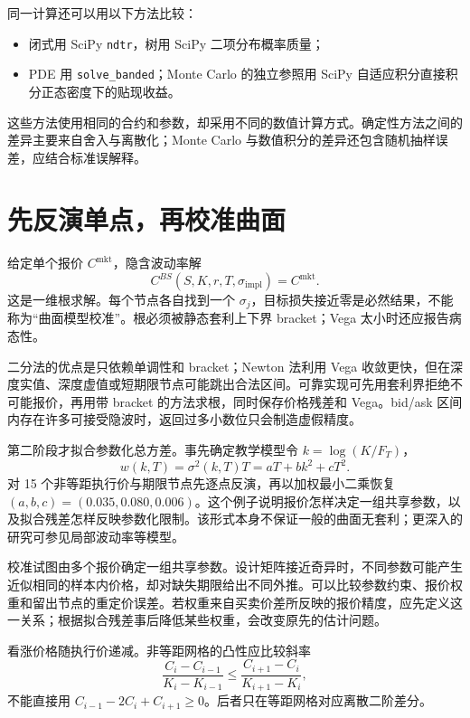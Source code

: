 同一计算还可以用以下方法比较：
\begin{itemize}
  \item 闭式用 SciPy \texttt{ndtr}，树用 SciPy 二项分布概率质量；
  \item PDE 用 \texttt{solve\_banded}；Monte Carlo 的独立参照用 SciPy 自适应积分直接积分正态密度下的贴现收益。
\end{itemize}
这些方法使用相同的合约和参数，却采用不同的数值计算方式。确定性方法之间的差异主要来自舍入与离散化；Monte Carlo 与数值积分的差异还包含随机抽样误差，应结合标准误解释。

\section{先反演单点，再校准曲面}

给定单个报价 $C^{\mathrm{mkt}}$，隐含波动率解
\[
 C^{BS}(S,K,r,T,\sigma_{\mathrm{impl}})=C^{\mathrm{mkt}}.
\]
这是一维根求解。每个节点各自找到一个 $\sigma_j$，目标损失接近零是必然结果，不能称为“曲面模型校准”。根必须被静态套利上下界 bracket；Vega 太小时还应报告病态性。



二分法的优点是只依赖单调性和 bracket；Newton 法利用 Vega 收敛更快，但在深度实值、深度虚值或短期限节点可能跳出合法区间。可靠实现可先用套利界拒绝不可能报价，再用带 bracket 的方法求根，同时保存价格残差和 Vega。bid/ask 区间内存在许多可接受隐波时，返回过多小数位只会制造虚假精度。

第二阶段才拟合参数化总方差。事先确定教学模型令 $k=\log(K/F_T)$，
\[
 w(k,T)=\sigma^2(k,T)T=aT+bk^2+cT^2.
\]
对 15 个非等距执行价与期限节点先逐点反演，再以加权最小二乘恢复 $(a,b,c)=(0.035,0.080,0.006)$。这个例子说明报价怎样决定一组共享参数，以及拟合残差怎样反映参数化限制。该形式本身不保证一般的曲面无套利；更深入的研究可参见局部波动率等模型\cite{dupire1994pricing}。

校准试图由多个报价确定一组共享参数。设计矩阵接近奇异时，不同参数可能产生近似相同的样本内价格，却对缺失期限给出不同外推。可以比较参数约束、报价权重和留出节点的重定价误差。若权重来自买卖价差所反映的报价精度，应先定义这一关系；根据拟合残差事后降低某些权重，会改变原先的估计问题。


看涨价格随执行价递减。非等距网格的凸性应比较斜率
\[
 \frac{C_i-C_{i-1}}{K_i-K_{i-1}}
 \le
 \frac{C_{i+1}-C_i}{K_{i+1}-K_i},
\]
不能直接用 $C_{i-1}-2C_i+C_{i+1}\ge0$。后者只在等距网格对应离散二阶差分。

